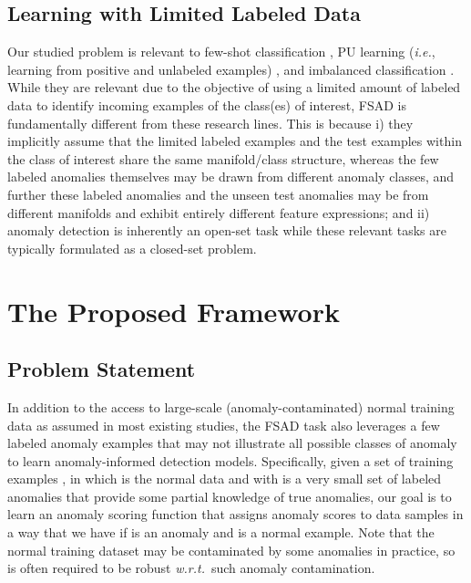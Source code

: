 \documentclass[10pt,journal,compsoc]{IEEEtran}
\begin{document}
\subsection{Learning with 
Limited Labeled Data}

Our studied problem is relevant to few-shot classification \cite{wang2020generalizing}, PU learning (\textit{i.e.}, learning from positive and unlabeled examples) \cite{bekker2020learning}, and imbalanced classification \cite{he2009imbalance,branco2016survey}. While they are relevant due to the objective of using a limited amount of labeled data to identify incoming examples of the class(es) of interest, FSAD is fundamentally different from these research lines. This is because i) they implicitly assume that the limited labeled examples and the test examples within the class of interest share the same manifold/class structure, whereas the few labeled anomalies themselves may be drawn from different anomaly classes, and further these labeled anomalies and the unseen test anomalies may be from different manifolds and exhibit entirely different feature expressions; and ii) anomaly detection is inherently an open-set task while these relevant tasks are typically formulated as a closed-set problem. 


\section{The Proposed Framework}

\subsection{Problem Statement}

In addition to the access to large-scale (anomaly-contaminated) normal training data as assumed in most existing studies, the FSAD task also leverages a few labeled anomaly examples that may not illustrate all possible  classes  of  anomaly to learn anomaly-informed detection models. Specifically, given a set of  training examples 
, in which  is the normal data and  with  is a very small set of labeled anomalies that provide some partial knowledge of true anomalies, our goal is to learn an anomaly scoring function  that assigns anomaly scores to data samples in a way that we have  if  is an anomaly and  is a normal example. Note that the normal training dataset  may be contaminated by some anomalies in practice, so  is often required to be robust \textit{w.r.t.}\   such anomaly contamination.
\end{document}
